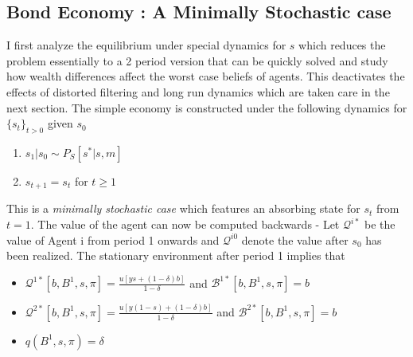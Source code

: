 \documentclass[12pt]{article}
\begin{document}
\subsection{Bond Economy : A Minimally Stochastic case}
I first analyze the equilibrium under special dynamics for $s$ which reduces the problem essentially to a 2 period version that can be quickly solved and study how wealth differences affect the worst case beliefs of agents. This deactivates the effects of distorted filtering and long run dynamics which are taken care in the next section. 
The simple economy is constructed under the following dynamics for $\{s_t\}_{t>0}$ given $s_0$
\begin{enumerate}
	\item $s_1|s_0 \sim P_S[s^*|s,m]$
	\item $s_{t+1}=s_{t}$ for $t\geq1$ 
\end{enumerate}
This is a \emph{minimally stochastic case} which features an absorbing state for $s_t$ from $t=1$. 
The value of the agent can now be computed backwards -  Let $\mathcal{Q}^{i *}$ be the value of Agent i from period 1 onwards and $\mathcal{Q}^{i 0}$ denote the value after $s_0$ has been realized. The stationary environment after period 1 implies that 
\begin{itemize}
	\item $\mathcal{Q}^{1*}[b,B^1,s,\pi]=\frac{u[ys+(1-\delta)b]}{1-\delta}$ and $\mathcal{B}^{1*}[b,B^1,s,\pi]=b$
	\item $\mathcal{Q}^{2*}[b,B^1,s,\pi]=\frac{u[y(1-s)+(1-\delta)b]}{1-\delta}$ and $\mathcal{B}^{2*}[b,B^1,s,\pi]=b$
	\item $q(B^1,s,\pi)=\delta$
\end{itemize}
\end{document}
